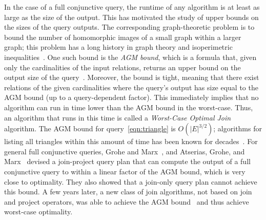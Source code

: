 \documentclass{theoretics}
\newcommand{\agm}{\textsf{AGM}\xspace}
\begin{document}
In the case of a full conjunctive query, the runtime of any algorithm is at least as large
as the size of the output.  This has motivated the study of upper bounds on the sizes of the
query outputs. The corresponding graph-theoretic problem is to bound the number of
homomorphic images of a small graph within a larger graph; this problem has a long history
in graph theory and isoperimetric
inequalities~\cite{MR0031538,MR599482,MR859293,MR1338683,10.1145/3196959.3196990,MR1639767}.
One such bound is the {\em \agm bound}, which is a formula that, given only the
cardinalities of the input relations, returns an upper bound on the output size of the
query~\cite{DBLP:journals/siamcomp/AtseriasGM13}. Moreover, the bound is tight, meaning that
there exist relations of the given cardinalities where the query's output has size equal to
the \agm bound (up to a query-dependent factor).  This immediately implies that no algorithm
can run in time lower than the \agm bound in the worst-case. Thus, an algorithm that runs in
this time is called a {\em Worst-Case Optimal Join}
algorithm.
The \agm bound for
query~\eqref{eqn:triangle} is $O(|E|^{3/2})$; algorithms for listing all triangles within
this amount of time has been known for decades~\cite{DBLP:conf/stoc/Itai77}.
For general full conjunctive queries, Grohe and Marx~\cite{DBLP:conf/soda/GroheM06}, and
Atserias, Grohe, and Marx~\cite{DBLP:journals/siamcomp/AtseriasGM13,DBLP:conf/focs/AtseriasGM08}
devised a join-project query plan that can compute the output of a full conjunctive query
to within a linear factor of the \agm bound, which is very close to optimality.
They also showed that a join-only query plan cannot achieve this bound.
A few years later, a new class of join algorithms, not based on join and project operators,
was able to achieve the \agm bound~\cite{DBLP:conf/icdt/Veldhuizen14,DBLP:journals/jacm/NgoPRR18}
and thus achieve worst-case optimality.
\end{document}
